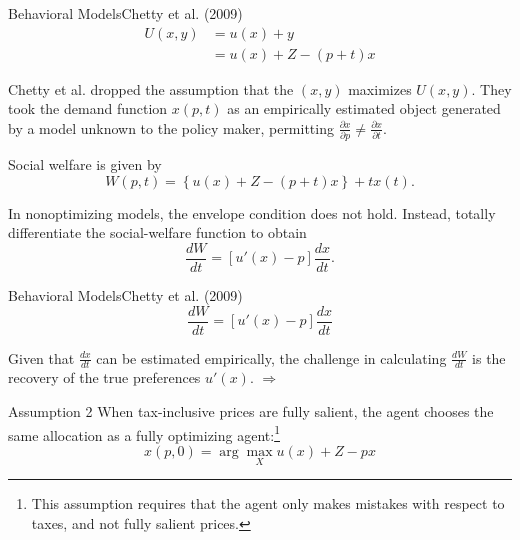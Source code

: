 \documentclass{beamer}
\begin{document}
\begin{frame}{Behavioral Models}{Chetty et al. (2009)}
	\begin{equation}
		\begin{aligned}
			U(x,y) &= u(x) + y \\
			&= u(x) + Z - (p+t)x
		\end{aligned}
	\end{equation}

	Chetty et al. dropped the assumption that the $(x,y)$ maximizes $U(x,y)$. They took the demand function $x(p,t)$ as an empirically estimated object generated by a model unknown to the policy maker, permitting $\frac{\partial x}{\partial p}\neq \frac{\partial x}{\partial t}$.
	\medskip

	Social welfare is given by
	\begin{equation}
		W(p,t) = \left\{u(x)+Z-(p+t)x\right\} + tx(t).
	\end{equation}

	In nonoptimizing models, the envelope condition does not hold. Instead, totally differentiate the social-welfare function to obtain
	\begin{equation}\label{eq35}
		\frac{dW}{dt} = \left[u'(x)-p\right]\frac{dx}{dt}.
	\end{equation}
\end{frame}
\begin{frame}{Behavioral Models}{Chetty et al. (2009)}
	\begin{equation}\nonumber
		\frac{dW}{dt} = \left[u'(x)-p\right]\frac{dx}{dt}
	\end{equation}
	\medskip

	Given that $\frac{dx}{dt}$ can be estimated empirically, the challenge in calculating $\frac{dW}{dt}$ is the recovery of the true preferences $u'(x)$. $\Rightarrow$
	\begin{block}{Assumption 2}
		When tax-inclusive prices are fully salient, the agent chooses the same allocation as a fully optimizing agent:\footnote{This assumption requires that the agent only makes mistakes with respect to taxes, and not fully salient prices.}
		\begin{equation}\nonumber
			x(p,0)= \arg \max_X u(x) + Z - px
		\end{equation}
	\end{block}
\end{frame}
\end{document}
